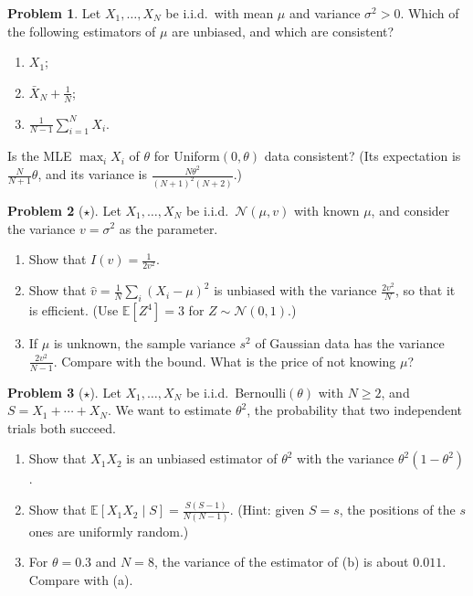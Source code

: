 \documentclass[11pt]{article}
\theoremstyle{definition}
\newtheorem{problem}{Problem}[section]
\newcommand{\E}{\mathbb{E}}
\begin{document}
\begin{problem}\label{pr:consistency}
    Let $X_1, \ldots, X_N$ be i.i.d.\ with mean $\mu$ and variance $\sigma^2 > 0$. Which of the following estimators of $\mu$ are unbiased, and which are consistent?
    \begin{enumerate}[label=(\alph*)]
        \item $X_1$;
        \item $\bar X_N + \frac{1}{N}$;
        \item $\frac{1}{N - 1}\sum_{i=1}^N X_i$.
    \end{enumerate}
    Is the MLE $\max_i X_i$ of $\theta$ for Uniform$(0, \theta)$ data consistent? (Its expectation is $\frac{N}{N + 1}\theta$, and its variance is $\frac{N\theta^2}{(N + 1)^2(N + 2)}$.)
\end{problem}

\begin{problem}[$\star$]\label{pr:cr-variance}
    Let $X_1, \ldots, X_N$ be i.i.d.\ $\mathcal{N}(\mu, v)$ with known $\mu$, and consider the variance $v = \sigma^2$ as the parameter.
    \begin{enumerate}[label=(\alph*)]
        \item Show that $I(v) = \frac{1}{2v^2}$.
        \item Show that $\hat v = \frac{1}{N}\sum_i (X_i - \mu)^2$ is unbiased with the variance $\frac{2v^2}{N}$, so that it is efficient. (Use $\E[Z^4] = 3$ for $Z \sim \mathcal{N}(0, 1)$.)
        \item If $\mu$ is unknown, the sample variance $s^2$ of Gaussian data has the variance $\frac{2v^2}{N - 1}$. Compare with the bound. What is the price of not knowing $\mu$?
    \end{enumerate}
\end{problem}

\begin{problem}[$\star$]\label{pr:rao-blackwell}
    Let $X_1, \ldots, X_N$ be i.i.d.\ Bernoulli$(\theta)$ with $N \geq 2$, and $S = X_1 + \cdots + X_N$. We want to estimate $\theta^2$, the probability that two independent trials both succeed.
    \begin{enumerate}[label=(\alph*)]
        \item Show that $X_1X_2$ is an unbiased estimator of $\theta^2$ with the variance $\theta^2(1 - \theta^2)$.
        \item Show that $\E[X_1X_2 \mid S] = \frac{S(S - 1)}{N(N - 1)}$. (Hint: given $S = s$, the positions of the $s$ ones are uniformly random.)
        \item For $\theta = 0.3$ and $N = 8$, the variance of the estimator of (b) is about $0.011$. Compare with (a).
    \end{enumerate}
\end{problem}
\end{document}
